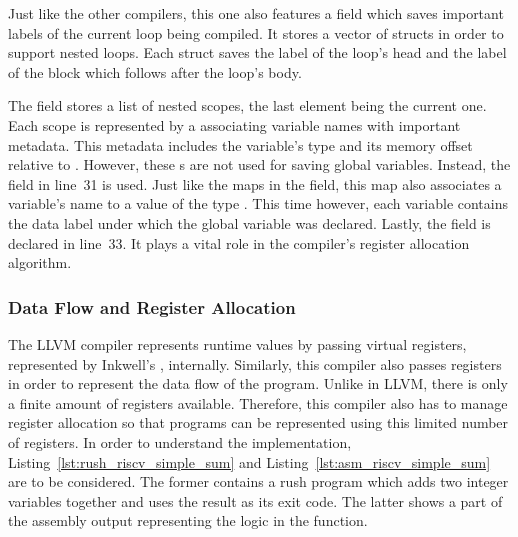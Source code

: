 Just like the other compilers, this one also features a  field which saves important labels of the current loop being compiled.
It stores a vector of  structs in order to support nested loops.
Each  struct saves the label of the loop's head and the label of the block which follows after the loop's body.

The  field stores a list of nested scopes, the last element being the current one.
Each scope is represented by a  associating variable names with important metadata.
This metadata includes the variable's type and its memory offset relative to .
However, these s are not used for saving global variables.
Instead, the  field in line~31 is used.
Just like the maps in the  field, this map also associates a variable's name to a value of the type .
This time however, each variable contains the data label under which the global variable was declared.
Lastly, the  field is declared in line~33.
It plays a vital role in the compiler's register allocation algorithm.

\subsubsection{Data Flow and Register Allocation}

The LLVM compiler represents runtime values by passing virtual registers, represented by Inkwell's , internally.
Similarly, this compiler also passes registers in order to represent the data flow of the program.
Unlike in LLVM, there is only a finite amount of registers available.
Therefore, this compiler also has to manage register allocation so that programs can be represented using this limited number of registers.
In order to understand the implementation, Listing~\ref{lst:rush_riscv_simple_sum} and Listing~\ref{lst:asm_riscv_simple_sum} are to be considered.
The former contains a rush program which adds two integer variables together and uses the result as its exit code.
The latter shows a part of the assembly output representing the logic in the  function.

\noindent
\begin{minipage}{.45\textwidth}
	\centering
\end{minipage}%
\hfill%
\begin{minipage}{.45\textwidth}
	\centering
	\vspace{.1cm}
\end{minipage}

